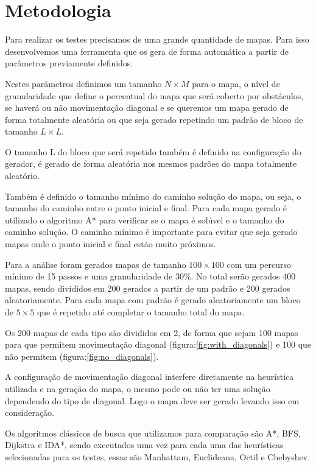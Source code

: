 \chapter[Metodologia]{Metodologia}
 
 Para realizar os testes precisamos de uma grande quantidade de mapas. Para isso desenvolvemos uma ferramenta que os gera de forma automática a partir de parâmetros previamente definidos.
 
 Nestes parâmetros definimos um tamanho $N\times M$ para o mapa, o nível de granularidade que define o percentual do mapa que será coberto por obstáculos, se haverá ou não movimentação diagonal e se queremos um mapa gerado de forma totalmente aleatória ou que seja gerado repetindo um padrão de bloco de tamanho $L\times L$. 
 
 O tamanho L do bloco que será repetido também é definido na configuração do gerador, é gerado de forma aleatória nos mesmos padrões do mapa totalmente aleatório. 
 
 Também é definido o tamanho mínimo do caminho solução do mapa, ou seja, o tamanho do caminho entre o ponto inicial e final.
 Para cada mapa gerado é utilizado o algoritmo A* para verificar se o mapa é solúvel e o tamanho do caminho solução. O caminho mínimo é importante para evitar que seja gerado mapas onde o ponto inicial e final estão muito próximos.
 
 Para a análise foram gerados mapas de tamanho  $100\times 100$  com um percurso mínimo de 15 passos e uma granularidade de 30\%.
 No total serão gerados 400 mapas, sendo divididos em 200 gerados a partir de um padrão e 200 gerados aleatoriamente. Para cada mapa com padrão é gerado aleatoriamente um bloco de $5\times 5$ que é repetido até completar o tamanho total do mapa.
 
 Os 200 mapas de cada tipo são divididos em 2, de forma que sejam 100 mapas para que permitem movimentação diagonal (figura:\ref{fig:with_diagonals}) e 100 que não permitem (figura:\ref{fig:no_diagonals}).
 
 A configuração de movimentação diagonal interfere diretamente na heurística utilizada e na geração do mapa, o mesmo pode ou não ter uma solução dependendo do tipo de diagonal. Logo o mapa deve ser gerado levando isso em consideração.
 
 Os algoritmos clássicos de busca que utilizamos para comparação são A\**, BFS, Dijkstra e IDA*, sendo executados uma vez para cada uma das heurísticas selecionadas para os testes, essas são Manhattam, Euclideana, Octil e Chebyshev.
 
